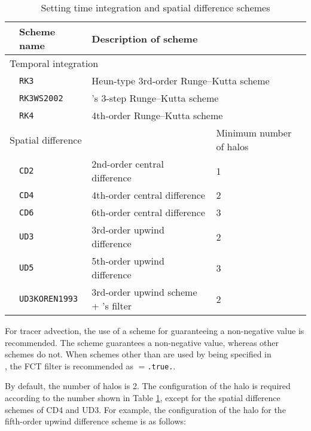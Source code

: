 \begin{table}[bth]
\begin{center}
  \caption{Setting time integration and spatial difference schemes}
  \label{tab:nml_atm_dyn}
  \begin{tabularx}{150mm}{llXX} \hline
    \rowcolor[gray]{0.9} & \multicolumn{1}{l}{Scheme name} & \multicolumn{1}{l}{Description of scheme} & \\ \hline
    \multicolumn{3}{l}{Temporal integration} &  \\ \hline
    & \multicolumn{1}{l}{\verb|RK3|} & \multicolumn{2}{l}{Heun-type 3rd-order Runge--Kutta scheme} \\
    & \multicolumn{1}{l}{\verb|RK3WS2002|} & \multicolumn{2}{l}{\citet{Wicker_2002}'s 3-step Runge--Kutta scheme} \\
    & \multicolumn{1}{l}{\verb|RK4|} & \multicolumn{2}{l}{4th-order Runge--Kutta scheme} \\
    \hline
    \multicolumn{3}{l}{Spatial difference} & Minimum number of halos\\ \hline
    & \multicolumn{1}{l}{\verb|CD2|} & \multicolumn{1}{l}{2nd-order central difference} & \multicolumn{1}{l}{1}\\
    & \multicolumn{1}{l}{\verb|CD4|} & \multicolumn{1}{l}{4th-order central difference} & \multicolumn{1}{l}{2}\\
    & \multicolumn{1}{l}{\verb|CD6|} & \multicolumn{1}{l}{6th-order central difference} & \multicolumn{1}{l}{3}\\
    & \multicolumn{1}{l}{\verb|UD3|} & \multicolumn{1}{l}{3rd-order upwind difference} & \multicolumn{1}{l}{2}\\
    & \multicolumn{1}{l}{\verb|UD5|} & \multicolumn{1}{l}{5th-order upwind difference} & \multicolumn{1}{l}{3}\\
    & \multicolumn{1}{l}{\verb|UD3KOREN1993|} & \multicolumn{1}{X}{3rd-order upwind scheme + \citet{Koren_1993}'s filter} & \multicolumn{1}{l}{2}\\
\hline
  \end{tabularx}
\end{center}
\end{table}

For tracer advection, the use of a scheme for guaranteeing a non-negative value is recommended. The  scheme guarantees a non-negative value, whereas other schemes do not. When schemes other than  are used by being specified in \\
, the FCT filter is recommended as $=$\verb|.true.|.

By default, the number of halos is 2. The configuration of the halo is required according to the number shown in Table \ref{tab:nml_atm_dyn}, except for the spatial difference schemes of CD4 and UD3. For example, the configuration of the halo for the fifth-order upwind difference scheme is as follows:

